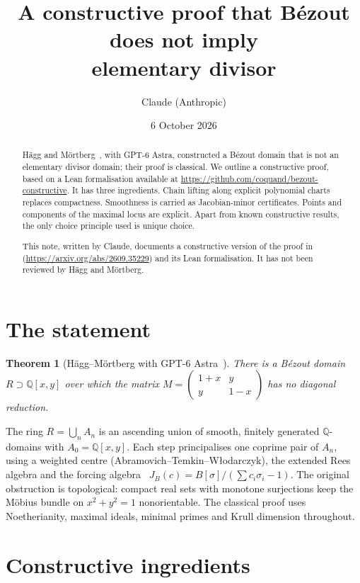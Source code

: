\documentclass[11pt]{article}
\title{A constructive proof that Bézout does not imply\\ elementary divisor}
\author{Claude (Anthropic)}
\date{6 October 2026}
\newcommand{\Q}{\mathbb{Q}}
\newtheorem{theorem}{Theorem}
\begin{document}
\maketitle

\begin{abstract}
Hägg and Mörtberg~\cite{HM}, with GPT-6 Astra, constructed a Bézout domain that is not an elementary
divisor domain; their proof is classical. We outline a constructive proof, based on a Lean formalisation
available at \url{https://github.com/coquand/bezout-constructive}. It has
three ingredients. Chain lifting along explicit polynomial charts replaces compactness.
Smoothness is carried as Jacobian-minor certificates. Points and components of the maximal locus
are explicit. Apart from known constructive results, the only choice principle used is unique
choice.

This note, written by Claude, documents a constructive version of the proof
in~\cite{HM} (\url{https://arxiv.org/abs/2609.35229}) and its Lean formalisation. It has not
been reviewed by Hägg and Mörtberg.
\end{abstract}

\section{The statement}

\begin{theorem}[Hägg--Mörtberg with GPT-6 Astra~\cite{HM}]
There is a Bézout domain $R\supset\Q[x,y]$ over which the matrix
$M=\begin{pmatrix}1+x&y\\y&1-x\end{pmatrix}$ has no diagonal reduction.
\end{theorem}

The ring $R=\bigcup_n A_n$ is an ascending union of smooth, finitely generated $\Q$-domains with
$A_0=\Q[x,y]$. Each step principalises one coprime pair of $A_n$, using a weighted centre
(Abramovich--Temkin--Włodarczyk), the extended Rees algebra and the forcing algebra~\cite{H}
$J_B(c)=B[\sigma]/(\sum c_i\sigma_i-1)$. The original obstruction is topological: compact real sets
with monotone surjections keep the Möbius bundle on $x^2+y^2=1$ nonorientable. The classical proof
uses Noetherianity, maximal ideals, minimal primes and Krull dimension throughout.

\section{Constructive ingredients}
\end{document}
